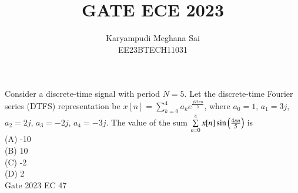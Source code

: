 \documentclass[journal,12pt,onecolumn]{IEEEtran}
\theoremstyle{remark}
\begin{document}
\let\vec\mathbf







\bigskip



\title{GATE ECE 2023}
\author{Karyampudi Meghana Sai\\ EE23BTECH11031}
\maketitle
Consider a discrete-time signal with period $N=5$. Let the discrete-time Fourier series (DTFS) representation be $x[n]=\sum\limits_{k=0}^{4} a_k e^{\frac{jk2\pi n}{5}}$, where $a_0=1$, $a_1=3j$, $a_2=2j$, $a_3=-2j$, $a_4=-3j$. The value of the sum $\sum\limits_{n=0}^{4}x[n] \sin\left(\frac{4\pi n}{5}\right)$ is\\
(A) -10\\
(B) 10\\
(C) -2\\
(D) 2\\
\hfill Gate 2023 EC 47
\end{document}
